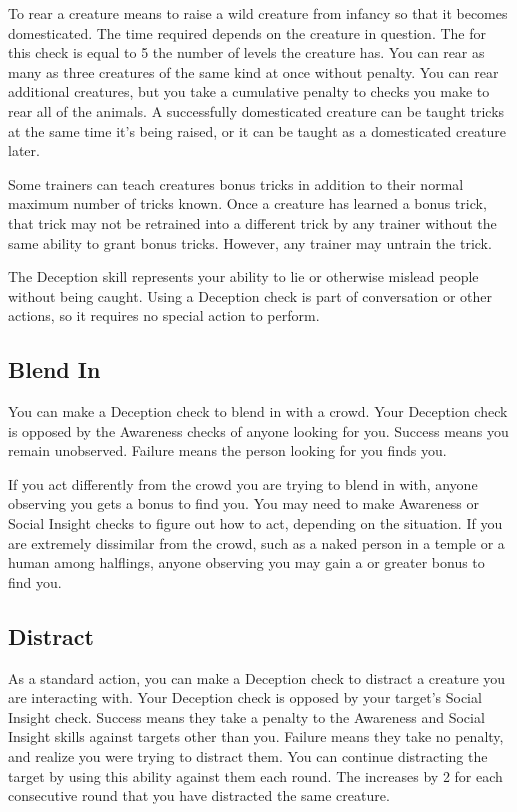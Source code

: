          To rear a creature means to raise a wild creature from infancy so that it becomes domesticated. The time required depends on the creature in question. The  for this check is equal to 5 \add the number of levels the creature has. You can rear as many as three creatures of the same kind at once without penalty. You can rear additional creatures, but you take a cumulative  penalty to checks you make to rear all of the animals. A successfully domesticated creature can be taught tricks at the same time it's being raised, or it can be taught as a domesticated creature later.

        \label{Bonus Tricks} Some trainers can teach creatures bonus tricks in addition to their normal maximum number of tricks known.
        Once a creature has learned a bonus trick, that trick may not be retrained into a different trick by any trainer without the same ability to grant bonus tricks.
        However, any trainer may untrain the trick.

\newpage
{}
        The Deception skill represents your ability to lie or otherwise mislead people without being caught.
        Using a Deception check is part of conversation or other actions, so it requires no special action to perform.

    \subsection{Blend In}
        You can make a Deception check to blend in with a crowd.
        Your Deception check is opposed by the Awareness checks of anyone looking for you.
        Success means you remain unobserved.
        Failure means the person looking for you finds you.

        If you act differently from the crowd you are trying to blend in with, anyone observing you gets a  bonus to find you. You may need to make Awareness or Social Insight checks to figure out how to act, depending on the situation. If you are extremely dissimilar from the crowd, such as a naked person in a temple or a human among halflings, anyone observing you may gain a  or greater bonus to find you.

    \subsection{Distract}\label{Distract}
        As a standard action, you can make a Deception check to distract a creature you are interacting with.
        Your Deception check is opposed by your target's Social Insight check.
        Success means they  take a  penalty to the Awareness and Social Insight skills against targets other than you.
        Failure means they take no penalty, and realize you were trying to distract them.
        You can continue distracting the target by using this ability against them each round.
        The  increases by 2 for each consecutive round that you have distracted the same creature.


